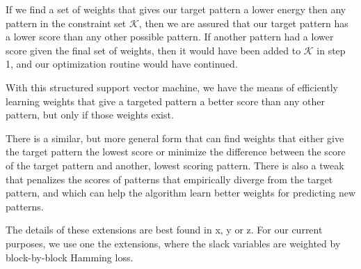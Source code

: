If we find a set of weights that gives our target pattern a lower
energy then any pattern in the constraint set $\mathcal{K}$, then we
are assured that our target pattern has a lower score than any other
possible pattern. If another pattern had a lower score given the final
set of weights, then it would have been added to $\mathcal{K}$ in step
1, and our optimization routine would have continued. 

With this structured support vector machine, we have the means of
efficiently learning weights that give a targeted pattern a better
score than any other pattern, but only if those weights exist. 

There is a similar, but more general form that can find weights that
either give the target pattern the lowest score or minimize the
difference between the score of the target pattern and another,
lowest scoring pattern. There is also a tweak that penalizes the
scores of patterns that empirically diverge from the target pattern,
and which can help the algorithm learn better weights for predicting
new patterns.

The details of these extensions are best found in x, y or z. For our
current purposes, we use one the extensions, where the slack variables
are weighted by block-by-block Hamming loss.
